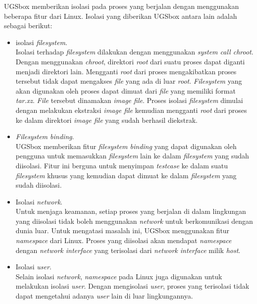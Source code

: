 \par UGSbox memberikan isolasi pada proses yang berjalan dengan menggunakan beberapa fitur dari Linux. Isolasi yang diberikan UGSbox antara lain adalah sebagai berikut:
\begin{itemize}
    \item isolasi \textit{filesystem}. \\ Isolasi terhadap \textit{filesystem} dilakukan dengan menggunakan \textit{system call chroot}. Dengan menggunakan \textit{chroot}, direktori \textit{root} dari suatu  proses dapat diganti menjadi direktori lain. Mengganti \textit{root} dari proses mengakibatkan proses tersebut tidak dapat mengakses \textit{file} yang ada di luar \textit{root}. \textit{Filesystem} yang akan digunakan oleh proses dapat dimuat dari \textit{file} yang memiliki format \textit{tar.xz}. \textit{File} tersebut dinamakan \textit{image file}. Proses isolasi \textit{filesystem} dimulai dengan melakukan ekstraksi \textit{image file} kemudian mengganti \textit{root} dari proses ke dalam direktori \textit{image file} yang sudah berhasil diekstrak. 

    \item \textit{Filesystem binding}. \\ UGSbox memberikan fitur \textit{filesystem binding} yang dapat digunakan oleh pengguna untuk memasukkan \textit{filesystem} lain ke dalam \textit{filesystem} yang sudah diisolasi. Fitur ini berguna untuk menyimpan \textit{testcase} ke dalam suatu \textit{filesystem} khusus yang kemudian dapat dimuat ke dalam \textit{filesystem} yang sudah diisolasi.

    \item Isolasi \textit{network}. \\ Untuk menjaga keamanan, setiap proses yang berjalan di dalam lingkungan yang diisolasi tidak boleh menggunakan \textit{network} untuk berkomunikasi dengan dunia luar. Untuk mengatasi masalah ini, UGSbox menggunakan fitur \textit{namespace} dari Linux. Proses yang diisolasi akan mendapat \textit{namespace} dengan \textit{network interface} yang terisolasi dari \textit{network interface} milik \textit{host}.

    \item Isolasi \textit{user}. \\ Selain isolasi \textit{network}, \textit{namespace} pada Linux juga digunakan untuk melakukan isolasi \textit{user}. Dengan mengisolasi \textit{user}, proses yang terisolasi tidak dapat mengetahui adanya \textit{user} lain di luar lingkungannya.


\end{itemize}
